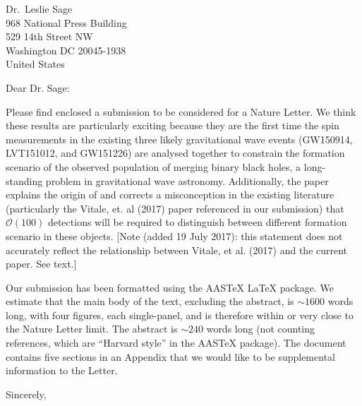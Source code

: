 \documentclass{letter}
\begin{document}
\begin{letter}{Dr.\ Leslie Sage\\968 National Press Building\\529 14th Street NW\\Washington DC 20045-1938\\United States}

\opening{Dear Dr. Sage:}

Please find enclosed a submission to be considered for a Nature
Letter.  We think these results are particularly exciting because they
are the first time the spin measurements in the existing three likely
gravitational wave events (GW150914, LVT151012, and GW151226) are
analysed together to constrain the formation scenario of the observed
population of merging binary black holes, a long-standing problem in
gravitational wave astronomy.  Additionally, the paper explains the
origin of and corrects a misconception in the existing literature
(particularly the Vitale, et. al (2017) paper referenced in our
submission) that $\mathcal{O}(100)$ detections will be required to
distinguish between different formation scenario in these objects.
[Note (added 19 July 2017): this statement does not accurately reflect
the relationship between Vitale, et al. (2017) and the current paper.
See text.]

Our submission has been formatted using the AASTeX LaTeX package.  We
estimate that the main body of the text, excluding the abstract, is
$\sim 1600$ words long, with four figures, each single-panel, and is
therefore within or very close to the Nature Letter limit.  The
abstract is $\sim 240$ words long (not counting references, which are
``Harvard style'' in the AASTeX package).  The document contains five
sections in an Appendix that we would like to be supplemental
information to the Letter.

\closing{Sincerely,}

\end{letter}
\end{document}
